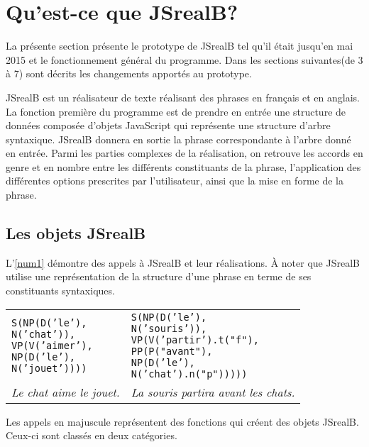 \documentclass[11pt]{article} %
\newcommand{\system}[1]{\textsf{#1}}
\newcommand{\JSB}{\system{JSrealB}}
\newcommand{\real}[1]{\emph{#1}}
\begin{document}
\section{Qu'est-ce que \JSB{}?}

La présente section présente le prototype de \JSB{} tel qu'il
était jusqu'en mai 2015 et le fonctionnement général du programme. 
Dans les sections suivantes(de 3 à 7) sont décrits
les changements apportés au prototype.

\JSB{} est un réalisateur de texte réalisant des phrases en français
et en anglais. La fonction première du programme est de prendre en
entrée une structure de données composée d'objets JavaScript
qui représente une structure d'arbre syntaxique.
\JSB{} donnera en sortie la phrase correspondante à l'arbre donné
en entrée. Parmi les parties complexes de la réalisation, on retrouve
les accords en genre et en nombre entre les différents constituants
de la phrase, l'application des différentes options prescrites par
l'utilisateur, ainsi que la mise en forme de la phrase. 

\subsection{Les objets \JSB{}}

L'\autoref{num1} démontre des appels à \JSB{} et leur réalisations. À noter que
\JSB{} utilise une représentation de la structure d'une phrase en terme
de ses constituants syntaxiques.\newline
\begin{example}
\caption{Quelques utilisations de \JSB{}}
\begin{tabular}{p{7cm} p{7cm}}
\begin{alltt}
S(NP(D('le'),
     N('chat')),
  VP(V('aimer'),
     NP(D('le'),
        N('jouet'))))
\end{alltt} &
\begin{alltt}
S(NP(D('le'),
     N('souris')),
  VP(V('partir').t("f"),
     PP(P("avant"),
        NP(D('le'),
           N('chat').n("p")))))
\end{alltt} \\
\real{Le chat aime le jouet.} & \real{La souris partira avant les chats.} \\
\end{tabular}
\label{num1}
\end{example}

Les appels en majuscule représentent des fonctions qui créent des objets \JSB{}. Ceux-ci sont
classés en deux catégories. 
\end{document}
